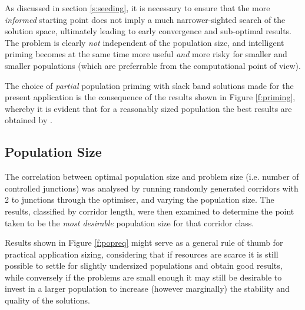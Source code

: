 As discussed in section \ref{s:seeding}, it is necessary to ensure that the more \emph{informed} starting point does not imply a much narrower-sighted search of the solution space, ultimately leading to early convergence and sub-optimal results. The problem is clearly \emph{not} independent of the population size, and intelligent priming becomes at the same time more useful \emph{and} more risky for smaller and smaller populations (which are preferrable from the computational point of view).

The choice of \emph{partial} population priming with slack band solutions made for the present application is the consequence of the results shown in Figure \ref{f:priming}, whereby it is evident that for a reasonably sized population  the best results are obtained by .




\subsection{Population Size} \label{r:popsize}
The correlation between optimal population size and problem size (i.e. number of controlled junctions) was analysed by running randomly generated corridors with 2 to  junctions through the optimiser, and varying the population size. 
The results, classified by corridor length, were then examined to determine the point  taken to be the \emph{most desirable} population size for that corridor class.

Results shown in Figure \ref{f:popreq} might serve as a general rule of thumb for practical application sizing, considering that if resources are scarce it is still possible to settle for slightly undersized populations and obtain good results, while conversely if the problems are small enough it may still be desirable to invest in a larger population to increase (however marginally) the stability and quality of the solutions.


